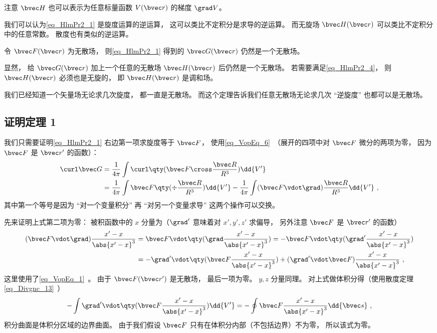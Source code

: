 注意 $\bvec H$ 也可以表示为任意标量函数 $V(\bvec r)$ 的梯度 $\grad V$。%

我们可以认为\autoref{eq_HlmPr2_1} 是旋度运算的逆运算， 这可以类比不定积分是求导的逆运算。 而无旋场 $\bvec H(\bvec r)$ 可以类比不定积分中的任意常数。 散度也有类似的逆运算。

\begin{theorem}{}\label{the_HlmPr2_2}
令 $\bvec F(\bvec r)$ 为无散场， 则\autoref{eq_HlmPr2_1} 得到的 $\bvec G(\bvec r)$ 仍然是一个无散场。
\end{theorem}
显然， 给 $\bvec G(\bvec r)$ 加上一个任意的无散场 $\bvec H(\bvec r)$ 后仍然是一个无散场。 若需要满足\autoref{eq_HlmPr2_4}， 则 $\bvec H(\bvec r)$ 必须也是无旋的， 即 $\bvec H(\bvec r)$ 是调和场。

我们已经知道一个矢量场无论求几次旋度， 都一直是无散场。 而这个定理告诉我们任意无散场无论求几次 “逆旋度” 也都可以是无散场。

\subsection{证明定理 1}
我们只需要证明\autoref{eq_HlmPr2_1} 右边第一项求旋度等于 $\bvec F$， 使用\autoref{eq_VopEq_6}~（展开的四项中对 $\bvec F$ 微分的两项为零， 因为 $\bvec F$ 是 $\bvec r'$ 的函数）：
\begin{equation}\label{eq_HlmPr2_3}
\begin{aligned}
\curl \bvec G &= \frac{1}{4\pi}\int \curl \qty(\bvec F \cross \frac{\bvec R}{R^3}) \dd{V'}\\
&= \frac{1}{4\pi}\int\bvec F \qty(\div \frac{\bvec R}{R^3}) \dd{V'} -  \frac{1}{4\pi}\int(\bvec F \vdot \grad) \frac{\bvec R}{R^3} \dd{V'}~,
\end{aligned}
\end{equation}
其中第一个等号是因为 “对一个变量积分” 再 “对另一个变量求导” 这两个操作可以交换。 %

先来证明上式第二项为零： 被积函数中的 $x$ 分量为（$\grad'$ 意味着对 $x', y', z'$ 求偏导， 另外注意 $\bvec F$ 是 $\bvec r'$ 的函数）
\begin{equation}\label{eq_HlmPr2_2}
\begin{aligned}
(\bvec F \vdot \grad) \frac{x' - x}{\abs{x'-x}^3} &= \bvec F \vdot \qty(\grad \frac{x' - x}{\abs{x'-x}^3}) = -\bvec F \vdot \qty(\grad' \frac{x' - x}{\abs{x'-x}^3})\\
&= - \grad' \vdot \qty(\bvec F \frac{x' - x}{\abs{x'-x}^3}) + (\grad' \vdot \bvec F) \frac{x' - x}{\abs{x'-x}^3}~,
\end{aligned}
\end{equation}
这里使用了\autoref{eq_VopEq_1}~。 由于 $\bvec F(\bvec r')$ 是无散场， 最后一项为零。 $y, z$ 分量同理。 对上式做体积分得（使用散度定理\autoref{eq_Divgnc_13}~）
\begin{equation}
- \int \grad' \vdot \qty(\bvec F \frac{x' - x}{\abs{x'-x}^3})\dd{V'} = -\oint \bvec F \frac{x' - x}{\abs{x'-x}^3} \dd{\bvec s}~,
\end{equation}
积分曲面是体积分区域的边界曲面。 由于我们假设 $\bvec F$ 只有在体积分内部（不包括边界）不为零， 所以该式为零。


